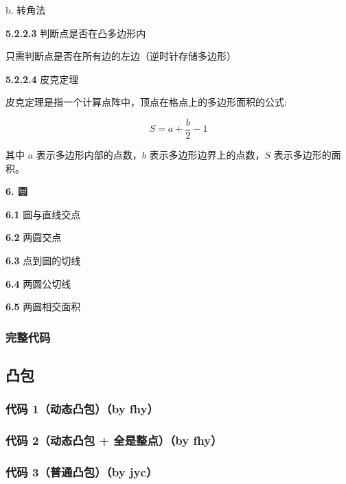 \documentclass[12pt]{article}
\begin{document}
b. 转角法

\textbf{5.2.2.3} 判断点是否在凸多边形内

只需判断点是否在所有边的左边（逆时针存储多边形）

\textbf{5.2.2.4} 皮克定理

皮克定理是指一个计算点阵中，顶点在格点上的多边形面积的公式:

$$
S = a + \frac{b}{2} - 1
$$

其中 $a$ 表示多边形内部的点数，$b$ 表示多边形边界上的点数，$S$ 表示多边形的面积。

\textbf{6. 圆}

\textbf{6.1} 圆与直线交点

\textbf{6.2} 两圆交点

\textbf{6.3} 点到圆的切线

\textbf{6.4} 两圆公切线

\textbf{6.5} 两圆相交面积

\newpage

\subsubsection{完整代码}



\newpage

\subsection{凸包}

\subsubsection{代码 1（动态凸包）（by fhy）}



\newpage

\subsubsection{代码 2（动态凸包 + 全是整点）（by fhy）}



\newpage

\subsubsection{代码 3（普通凸包）（by jyc）}
\end{document}
